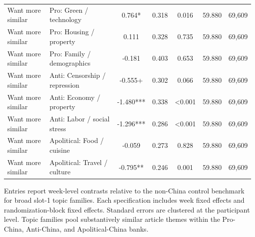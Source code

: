 \begin{table}[H]
\begin{threeparttable}
\begin{tabular}{llccccc}
Want more similar & Pro: Green / technology & 0.764* & 0.318 & 0.016 & 59.880 & 69,609 \\
Want more similar & Pro: Housing / property & 0.111 & 0.328 & 0.735 & 59.880 & 69,609 \\
Want more similar & Pro: Family / demographics & -0.181 & 0.403 & 0.653 & 59.880 & 69,609 \\
Want more similar & Anti: Censorship / repression & -0.555+ & 0.302 & 0.066 & 59.880 & 69,609 \\
Want more similar & Anti: Economy / property & -1.480*** & 0.338 & <0.001 & 59.880 & 69,609 \\
Want more similar & Anti: Labor / social stress & -1.296*** & 0.286 & <0.001 & 59.880 & 69,609 \\
Want more similar & Apolitical: Food / cuisine & -0.059 & 0.273 & 0.828 & 59.880 & 69,609 \\
Want more similar & Apolitical: Travel / culture & -0.795** & 0.246 & 0.001 & 59.880 & 69,609 \\
\bottomrule
\end{tabular}
\begin{tablenotes}[flushleft]
\footnotesize
\item Entries report week-level contrasts relative to the non-China control benchmark for broad slot-1 topic families. Each specification includes week fixed effects and randomization-block fixed effects. Standard errors are clustered at the participant level. Topic families pool substantively similar article themes within the Pro-China, Anti-China, and Apolitical-China banks.
\end{tablenotes}
\end{threeparttable}
\end{table}
